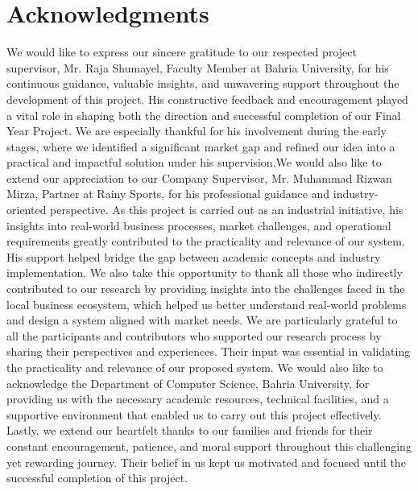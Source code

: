\chapter*{Acknowledgments}

We would like to express our sincere gratitude to our respected project supervisor, Mr. Raja Shumayel, Faculty Member at Bahria University, for his continuous guidance, valuable insights, and unwavering support throughout the development of this project. His constructive feedback and encouragement played a vital role in shaping both the direction and successful completion of our Final Year Project. We are especially thankful for his involvement during the early stages, where we identified a significant market gap and refined our idea into a practical and impactful solution under his supervision.We would also like to extend our appreciation to our Company Supervisor, Mr. Muhammad Rizwan Mirza, Partner at Rainy Sports, for his professional guidance and industry-oriented perspective. As this project is carried out as an industrial initiative, his insights into real-world business processes, market challenges, and operational requirements greatly contributed to the practicality and relevance of our system. His support helped bridge the gap between academic concepts and industry implementation.
We also take this opportunity to thank all those who indirectly contributed to our research by providing insights into the challenges faced in the local business ecosystem, which helped us better understand real-world problems and design a system aligned with market needs. We are particularly grateful to all the participants and contributors who supported our research process by sharing their perspectives and experiences. Their input was essential in validating the practicality and relevance of our proposed system.
We would also like to acknowledge the Department of Computer Science, Bahria University, for providing us with the necessary academic resources, technical facilities, and a supportive environment that enabled us to carry out this project effectively.
Lastly, we extend our heartfelt thanks to our families and friends for their constant encouragement, patience, and moral support throughout this challenging yet rewarding journey. Their belief in us kept us motivated and focused until the successful completion of this project.

\vspace{10mm}


